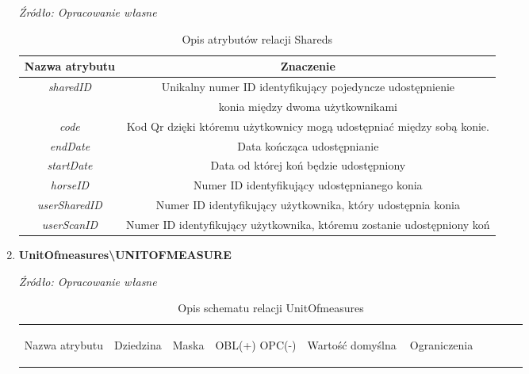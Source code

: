 \documentclass[12pt,oneside]{report}
\begin{document}
\begin{enumerate}[start=10,label={\bfseries REL\textbackslash\arabic*}]
	\begin{table}[H]
		\caption{Opis atrybutów relacji Shareds}
		\textit{Źródło: Opracowanie własne}
		\label{SharedsAttributeDescription}
		\centering
		\begin{tabular}{|c|c|}
			\hline
			Nazwa atrybutu & Znaczenie \\
			\hline			
			\textit{sharedID}&Unikalny numer ID identyfikujący pojedyncze udostępnienie \\
			& konia między dwoma użytkownikami\\
			\hline			
			\textit{code}& Kod Qr dzięki któremu użytkownicy mogą udostępniać między sobą konie.\\				
			\hline			
			\textit{endDate}& Data kończąca udostępnianie\\
			\hline			
			\textit{startDate}& Data od której koń będzie udostępniony\\				
			\hline
			\textit{horseID}&Numer ID identyfikujący udostępnianego konia\\				
			\hline
			\textit{userSharedID}& Numer ID identyfikujący użytkownika, który udostępnia konia \\				
			\hline
			\textit{userScanID}&Numer ID identyfikujący użytkownika, któremu zostanie udostępniony koń\\	
			\hline
		\end{tabular}
	\end{table}
\newpage
	\item \textbf{UnitOfmeasures\textbackslash UNITOFMEASURE}
	 \begin{table}[H]
		\caption{Opis schematu relacji UnitOfmeasures}
		\centering
		\textit{Źródło: Opracowanie własne}
		\\
		\label{UnitOfmeasuresRelationSchema}
		\centering
		\begin{tabular}{|c|c|c|c|c|c|c|c|c|c|}
			\hline
			\begin{sideways}Nazwa atrybutu\end{sideways}& 
			\begin{sideways}Dziedzina \end{sideways}& 
			\begin{sideways}Maska \end{sideways}& 
			\begin{sideways}OBL(+) OPC(-)\end{sideways} & 
			\begin{sideways}Wartość domyślna$\ $\end{sideways}& 
			\begin{sideways}Ograniczenia\end{sideways} &

\end{tabular}
\end{table}
\end{enumerate}
\end{document}
